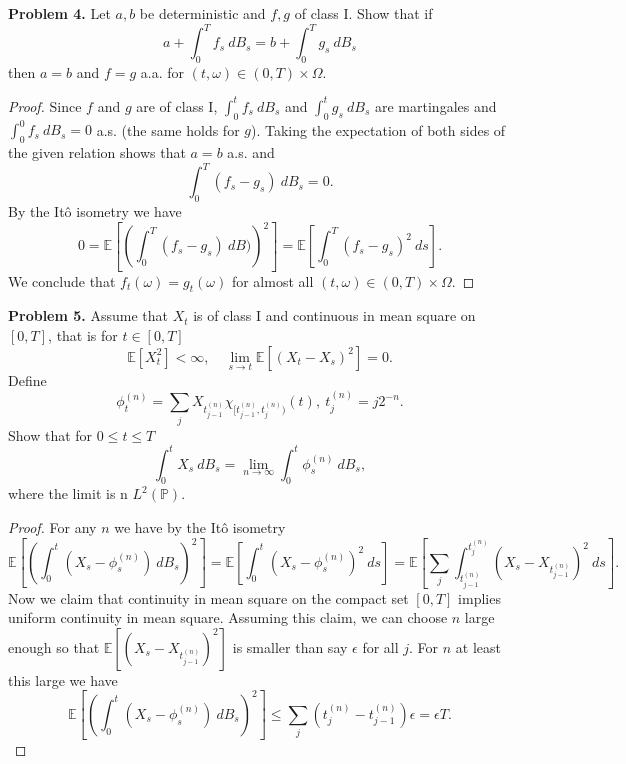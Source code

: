 \documentclass[11pt,letterpaper]{report}
\newcommand{\E}{\mathbb{E}}
\newcommand{\Prob}{\mathbb{P}}
\begin{document}
\noindent\textbf{Problem 4. }
Let $a,b$ be deterministic and $f,g$ of class I. Show that if
\begin{equation}\label{ints}
a + \int_0^Tf_s\ dB_s = b+ \int_0^Tg_s\ dB_s
\end{equation}
then $a = b$ and $f = g$ a.a. for $(t, \omega) \in (0, T)\times \Omega$.
\begin{proof}
	Since $f$ and $g$ are of class I, $\int_0^t f_s\ dB_s$ and $\int_0^t g_s\ dB_s$ are martingales and $\int_0^0 f_s\ dB_s = 0$ a.s. (the same holds for $g$). Taking the expectation of both sides of the given relation shows that $a = b$ a.s. and
	\[
	\int_0^T(f_s - g_s)\ dB_s = 0.
	\]
	By the It\^o isometry we have
	\[
	0 = \E\left[\left(\int_0^T(f_s - g_s)\ dB)\right)^2\right] = \E\left[\int_0^T(f_s - g_s)^2\ ds\right].
	\]
	We conclude that $f_t(\omega) = g_t(\omega)$ for almost all $(t, \omega)\in (0, T)\times \Omega$.
\end{proof}

\noindent\textbf{Problem 5. }
Assume that $X_t$ is of class I and continuous in mean square on $[0, T]$, that is for $t\in [0, T]$
\[
\E[X_t^2]<\infty,\quad \lim_{s\to t}\E[(X_t-X_s)^2] = 0.
\]
Define
\[
\phi_t^{(n)} = \sum_jX_{t^{(n)}_{j-1}}\chi_{[t^{(n)}_{j-1}, t^{(n)}_j)}(t),\ t^{(n)}_j = j2^{-n}.
\]
Show that for $0\leq t\leq T$
\[
\int_0^tX_s\ dB_s = \lim_{n\to \infty}\int_0^t\phi^{(n)}_s\ dB_s,
\]
where the limit is n $L^2(\Prob)$.
\begin{proof}
	For any $n$ we have by the It\^o isometry
	\[
	\E\left[\left(\int_0^t(X_s - \phi^{(n)}_s)\ dB_s\right)^2\right] = \E\left[\int_0^t(X_s - \phi^{(n)}_s)^2\ ds\right] = \E\left[\sum_j\int_{t_{j-1}^{(n)}}^{t_j^{(n)}} (X_s - X_{t_{j-1}^{(n)}})^2\ ds \right].
	\]
	Now we claim that continuity in mean square on the compact set $[0, T]$ implies uniform continuity in mean square. Assuming this claim, we can choose $n$ large enough so that $\E[(X_s - X_{t_{j-1}^{(n)}})^2]$ is smaller than say $\epsilon$ for all $j$. For $n$ at least this large we have
	\[
	\E\left[\left(\int_0^t(X_s - \phi^{(n)}_s)\ dB_s\right)^2\right] \leq \sum_j(t_j^{(n)} - t_{j-1}^{(n)})\epsilon = \epsilon T.
	\]
	
\end{proof}
\end{document}
